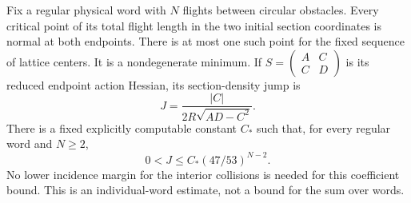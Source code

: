 \begin{proposition}
\label{prop:general-edge}
Fix a regular physical word with $N$ flights between circular obstacles. Every critical point of its total flight length in the two initial section coordinates is normal at both endpoints. There is at most one such point for the fixed sequence of lattice centers. It is a nondegenerate minimum. If $S=\left(\begin{smallmatrix}A&C\\C&D\end{smallmatrix}\right)$ is its reduced endpoint action Hessian, its section-density jump is
\begin{equation}\label{eq:general-edge}
 J=\frac{|C|}{2R\sqrt{AD-C^2}}.
\end{equation}
There is a fixed explicitly computable constant $C_*$ such that, for every regular word and $N\ge2$,
\begin{equation}\label{eq:edge-decay}
                  0<J\le C_*(47/53)^{N-2}.
\end{equation}
No lower incidence margin for the interior collisions is needed for this coefficient bound. This is an individual-word estimate, not a bound for the sum over words.
\end{proposition}

